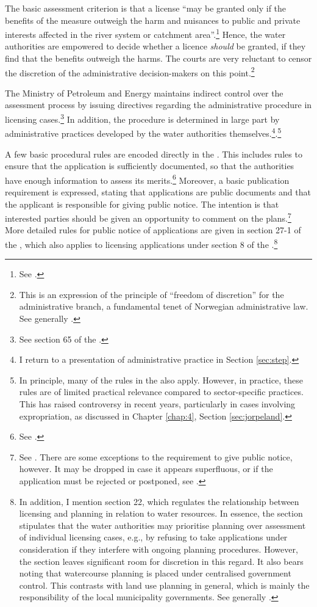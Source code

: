 The basic assessment criterion is that a license ``may be granted only if the benefits of the measure outweigh the harm and nuisances to public and private interests affected in the river system or catchment area''.\footnote{See \cite[25]{wra00}.} Hence, the water authorities are empowered to decide whether a licence {\it should} be granted, if they find that the benefits outweigh the harms. The courts are very reluctant to censor the discretion of the administrative decision-makers on this point.\footnote{This is an expression of the principle of ``freedom of discretion'' for the administrative branch, a fundamental tenet of Norwegian administrative law. See generally \cite[71-74]{eckhoff14}.}

The Ministry of Petroleum and Energy maintains indirect control over the assessment process by issuing directives regarding the administrative procedure in licensing cases.\footnote{See section 65 of the \cite{wra00}.} In addition, the procedure is determined in large part by administrative practices developed by the water authorities themselves.\footnote{I return to a presentation of administrative practice in Section \ref{sec:step}.}.\footnote{In principle, many of the rules in the \cite{paa67} also apply. However, in practice, these rules are of limited practical relevance compared to sector-specific practices. This has raised controversy in recent years, particularly in cases involving expropriation, as discussed in Chapter \ref{chap:4}, Section \ref{sec:jorpeland}.} 

A few basic procedural rules are encoded directly in the \cite{wra00}. This includes rules to ensure that the application is sufficiently documented, so that the authorities have enough information to assess its merits.\footnote{See \cite[23]{wra00}.} Moreover, a basic publication requirement is expressed, stating that applications are public documents and that the applicant is responsible for giving public notice. The intention is that interested parties should be given an opportunity to comment on the plans.\footnote{See \cite[24]{wra00}. There are some exceptions to the requirement to give public notice, however. It may be dropped in case it appears superfluous, or if the application must be rejected or postponed, see \cite[24a-24c]{wra00}.} More detailed rules for public notice of applications are given in section 27-1 of the \cite{pb08}, which also applies to licensing applications under section 8 of the \cite{wra00}.\footnote{In addition, I mention section 22, which regulates the relationship between licensing and planning in relation to water resources. In essence, the section stipulates that the water authorities may prioritise planning over assessment of individual licensing cases, e.g., by refusing to take applications under consideration if they interfere with ongoing planning procedures. However, the section leaves significant room for discretion in this regard. It also bears noting that watercourse planning is placed under centralised government control. This contrasts with land use planning in general, which is mainly the responsibility of the local municipality governments. See generally \cite{sp}.}

